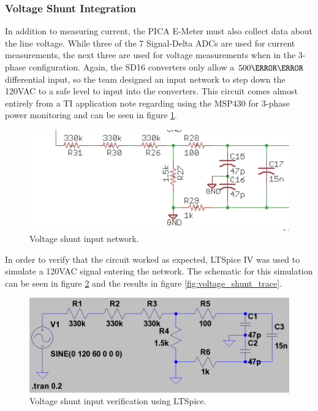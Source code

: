 \subsubsection{Voltage Shunt Integration}
In addition to measuring current, the PICA E-Meter must also collect data about the line voltage. While three of the 7 Signal-Delta \acp{ADC} are used for current measurements, the next three are used for voltage measurements when in the 3-phase configuration. Again, the SD16 converters only allow a $500\milli\volt$ differential input, so the team designed an input network to step down the 120VAC to a safe level to input into the converters. This circuit comes almost entirely from a \ac{TI} application note regarding using the MSP430 for 3-phase power monitoring \cite{slaa409} and can be seen in figure \ref{fig:voltage_shunt_input_network}.

\begin{figure}[htbp]
  \centering
  \includegraphics[width=5in]{includes/emeterhw/voltage_shunt_eagle_schem}
  \caption{Voltage shunt input network.}
  \label{fig:voltage_shunt_input_network}
\end{figure}

In order to verify that the circuit worked as expected, LTSpice IV was used to simulate a 120VAC signal entering the network. The schematic for this simulation can be seen in figure \ref{fig:voltage_shunt_ltspice} and the results in figure \ref{fig:voltage_shunt_trace}.
\begin{figure}[htbp]
  \centering
  \includegraphics[width=5in]{includes/emeterhw/voltage_shunt_ltspice}
  \caption{Voltage shunt input verification using LTSpice.}
  \label{fig:voltage_shunt_ltspice}
\end{figure}

